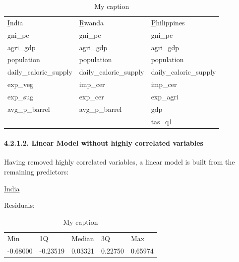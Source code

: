 \documentclass[12pt,a4paper,english]{article}
\begin{document}
\FloatBarrier
\begin{table}[!htbp]
\centering
\begin{tabular}{lll}
{\ul India}            & {\ul Rwanda}           & {\ul Philippines}      \\
gni\_pc                & gni\_pc                & gni\_pc                \\
agri\_gdp              & agri\_gdp              & agri\_gdp              \\
population             & population             & population             \\
daily\_caloric\_supply & daily\_caloric\_supply & daily\_caloric\_supply \\
exp\_veg               & imp\_cer               & imp\_cer               \\
exp\_sug               & exp\_cer               & exp\_agri              \\
avg\_p\_barrel         & avg\_p\_barrel         & gdp                    \\
                       &                        & tas\_q1               
\end{tabular}
\caption{My caption}
\label{my-label}
\end{table}
\FloatBarrier

\paragraph{4.2.1.2. Linear Model without highly correlated variables}

Having removed highly correlated variables, a linear model is built from the remaining predictors:
\begin{center}\underline{India}\\ \end{center}
Residuals:
\begin{table}[!htbp]
\centering
\caption{My caption}
\label{my-label}
\begin{tabular}{lllll}
Min      & 1Q       & Median  & 3Q      & Max     \\
-0.68000 & -0.23519 & 0.03321 & 0.22750 & 0.65974
\end{tabular}
\end{table}
\end{document}
